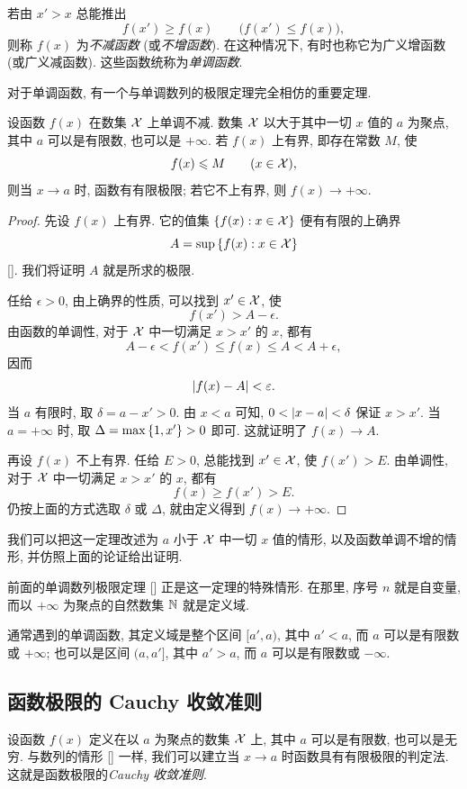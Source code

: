 {\kaishu 若由 $x'>x$ 总能推出
$$
f(x')\geq f(x)\qquad\bigl(f(x')\leq f(x)\bigr),
$$
则称 $f(x)$ 为\emph{不减函数}
(或\emph{不增函数}).}
在这种情况下, 有时也称它为广义增函数 (或广义减函数).
这些函数统称为\emph{单调函数}.

对于单调函数, 有一个与单调数列的极限定理完全相仿的重要定理.

\begin{theorem}\label{thm:monotone_function_limit}
设函数 $f(x)$ 在数集 $\mathcal{X}$ 上单调不减.
数集 $\mathcal{X}$ 以大于其中一切 $x$ 值的 $a$ 为聚点,
其中 $a$ 可以是有限数, 也可以是 $+\infty$.
若 $f(x)$ 上有界, 即存在常数 $M$, 使
$$
f(x)\leqslant M\qquad(x\in\mathcal{X}),
$$
则当 $x\to a$ 时, 函数有有限极限; 若它不上有界, 则 $f(x)\to+\infty$.
\end{theorem}

\begin{proof}
先设 $f(x)$ 上有界.
它的值集 $\left\{ f(x):x\in\mathcal{X} \right\}$ 便有有限的上确界
$$
A=\sup\left\{ f(x):x\in\mathcal{X} \right\}
$$
[]. 我们将证明 $A$ 就是所求的极限.

任给 $\epsilon>0$, 由上确界的性质, 可以找到 $x'\in\mathcal{X}$, 使
$$
f(x')>A-\epsilon.
$$
由函数的单调性, 对于 $\mathcal{X}$ 中一切满足 $x>x'$ 的 $x$, 都有
$$
A-\epsilon<f(x')\leq f(x)\leq A<A+\epsilon,
$$
因而
$$
\left| f(x)-A \right|<\varepsilon.
$$
当 $a$ 有限时, 取 $\delta=a-x'>0$.
由 $x<a$ 可知, $0<\left| x-a \right|<\delta$ 保证 $x>x'$.
当 $a=+\infty$ 时, 取 $\Delta=\max\left\{ 1,x' \right\}>0$ 即可.
这就证明了 $f(x)\to A$.

再设 $f(x)$ 不上有界. 任给 $E>0$, 总能找到 $x'\in\mathcal{X}$, 使 $f(x')>E$.
由单调性, 对于 $\mathcal{X}$ 中一切满足 $x>x'$ 的 $x$, 都有
$$
f(x)\geq f(x')>E.
$$
仍按上面的方式选取 $\delta$ 或 $\Delta$, 就由定义得到 $f(x)\to+\infty$.
\end{proof}

我们可以把这一定理改述为 $a$ 小于 $\mathcal{X}$ 中一切 $x$ 值的情形,
以及函数单调不增的情形, 并仿照上面的论证给出证明.

前面的单调数列极限定理 [] 正是这一定理的特殊情形.
在那里, 序号 $n$ 就是自变量, 而以 $+\infty$ 为聚点的自然数集 $\mathbb{N}$ 就是定义域.

通常遇到的单调函数, 其定义域是整个区间 $[a',a)$,
其中 $a'<a$, 而 $a$ 可以是有限数或 $+\infty$;
也可以是区间 $(a,a']$, 其中 $a'>a$, 而 $a$ 可以是有限数或 $-\infty$.

\subsection{函数极限的 Cauchy 收敛准则}\label{subsec:58}
设函数 $f(x)$ 定义在以 $a$ 为聚点的数集 $\mathcal{X}$ 上,
其中 $a$ 可以是有限数, 也可以是无穷.
与数列的情形 [] 一样,
我们可以建立当 $x\to a$ 时函数具有有限极限的判定法.
这就是函数极限的\emph{Cauchy 收敛准则}.

